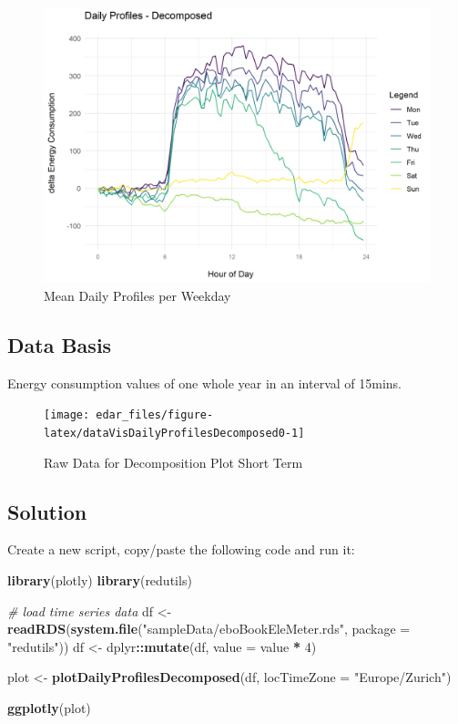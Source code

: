\documentclass[
  a4paperpaper,
]{book}
\newenvironment{Shaded}{\begin{snugshade}}{\end{snugshade}}
\newcommand{\CommentTok}[1]{\textcolor[rgb]{0.56,0.35,0.01}{\textit{#1}}}
\newcommand{\DataTypeTok}[1]{\textcolor[rgb]{0.13,0.29,0.53}{#1}}
\newcommand{\DecValTok}[1]{\textcolor[rgb]{0.00,0.00,0.81}{#1}}
\newcommand{\KeywordTok}[1]{\textcolor[rgb]{0.13,0.29,0.53}{\textbf{#1}}}
\newcommand{\NormalTok}[1]{#1}
\newcommand{\OperatorTok}[1]{\textcolor[rgb]{0.81,0.36,0.00}{\textbf{#1}}}
\newcommand{\StringTok}[1]{\textcolor[rgb]{0.31,0.60,0.02}{#1}}
\let\oldShaded\Shaded
\let\endoldShaded\endShaded
\renewenvironment{Shaded}{\footnotesize\oldShaded}{\endoldShaded}
\begin{document}
\begin{figure}
\includegraphics[width=0.7\linewidth]{images/plotDailyProfDecomposed} \caption{Mean Daily Profiles per Weekday}\label{fig:unnamed-chunk-24}
\end{figure}

\hypertarget{data-basis-15}{%
\subsection{Data Basis}\label{data-basis-15}}

Energy consumption values of one whole year in an interval of 15mins.

\begin{figure}
\texttt{[image: edar\_files/figure-latex/dataVisDailyProfilesDecomposed0-1]} \caption{Raw Data for Decomposition Plot Short Term}\label{fig:dataVisDailyProfilesDecomposed0}
\end{figure}

\newpage

\hypertarget{solution-15}{%
\subsection{Solution}\label{solution-15}}

Create a new script, copy/paste the following code and run it:

\begin{Shaded}
\begin{Highlighting}[]
\KeywordTok{library}\NormalTok{(plotly)}
\KeywordTok{library}\NormalTok{(redutils)}

\CommentTok{# load time series data}
\NormalTok{df <-}\StringTok{ }\KeywordTok{readRDS}\NormalTok{(}\KeywordTok{system.file}\NormalTok{(}\StringTok{"sampleData/eboBookEleMeter.rds"}\NormalTok{, }\DataTypeTok{package =} \StringTok{"redutils"}\NormalTok{))}
\NormalTok{df <-}\StringTok{ }\NormalTok{dplyr}\OperatorTok{::}\KeywordTok{mutate}\NormalTok{(df, }\DataTypeTok{value =}\NormalTok{ value }\OperatorTok{*}\StringTok{ }\DecValTok{4}\NormalTok{)}

\NormalTok{plot <-}\StringTok{ }\KeywordTok{plotDailyProfilesDecomposed}\NormalTok{(df, }\DataTypeTok{locTimeZone =} \StringTok{"Europe/Zurich"}\NormalTok{)}

\KeywordTok{ggplotly}\NormalTok{(plot)}
\end{Highlighting}
\end{Shaded}
\end{document}
